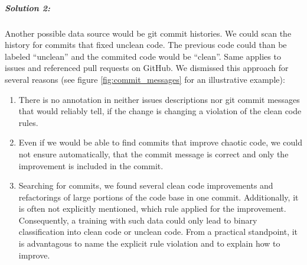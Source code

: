 \subparagraph{Solution 2:}
Another possible data source would be git commit histories. We could scan the history for commits that fixed unclean code. The previous code could than be labeled \enquote{unclean} and the commited code would be \enquote{clean}.
Same applies to issues and referenced pull requests on GitHub.
We dismissed this approach for several reasons (see figure \ref{fig:commit_messages} for an illustrative example):
\begin{enumerate}
    \item There is no annotation in neither issues descriptions nor git commit messages that would reliably tell, if the change is changing a violation of the clean code rules.
    \item Even if we would be able to find commits that improve chaotic code, we could not ensure automatically, that the commit message is correct and only the improvement is included in the commit.
    \item Searching for commits, we found several clean code improvements and refactorings of large portions of the code base in one commit. Additionally, it is often not explicitly mentioned, which rule applied for the improvement. Consequently, a training with such data could only lead to binary classification into clean code or unclean code. From a practical standpoint, it is advantagous to name the explicit rule violation and to explain how to improve.
\end{enumerate}


